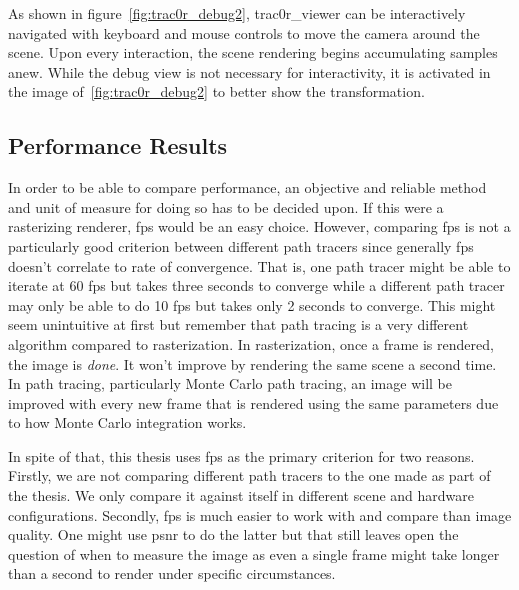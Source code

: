 \documentclass[
  twoside,
  11pt, a4paper,
  footinclude=true,
  headinclude=true,
  cleardoublepage=empty
]{scrreprt}
\begin{document}
As shown in figure~\ref{fig:trac0r_debug2}, trac0r\_viewer can be interactively navigated with
keyboard and mouse controls to move the camera around the scene. Upon every interaction, the scene
rendering begins accumulating samples anew. While the debug view is not necessary for
interactivity, it is activated in the image of~\ref{fig:trac0r_debug2} to better show the
transformation.

\subsection{Performance Results}
In order to be able to compare performance, an objective and reliable method and unit of
measure for doing so has to be decided upon. If this were a rasterizing renderer, \ac{fps} would be
an easy choice.
However, comparing \ac{fps} is not a particularly good criterion between different path tracers since
generally \ac{fps} doesn't correlate to rate of convergence. That is, one path tracer might be able
to iterate at 60 \ac{fps} but takes three seconds to converge while a different path tracer may
only be able to do 10 \ac{fps} but takes only 2 seconds to converge. This might seem unintuitive at
first but remember that path tracing is a very different algorithm compared to rasterization. In
rasterization, once a frame is rendered, the image is \emph{done}. It won't improve by rendering the
same scene a second time. In path tracing, particularly Monte Carlo path tracing, an image will be
improved with every new frame that is rendered using the same parameters due to how Monte Carlo
integration works.

In spite of that, this thesis uses \ac{fps} as the primary criterion for two reasons. Firstly, we are not
comparing different path tracers to the one made as part of the thesis. We only compare it
against itself in different scene and hardware configurations. Secondly, \ac{fps} is much easier
to work with and compare than image quality. One might use \ac{psnr} to do the latter but that
still leaves open the question of when to measure the image as even a single frame might take
longer than a second to render under specific circumstances.
\end{document}
